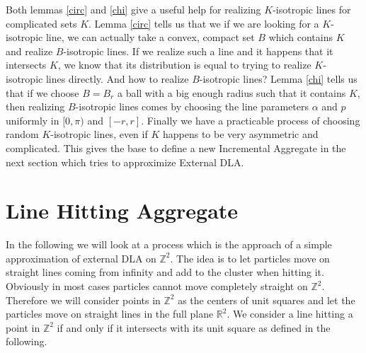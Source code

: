 \documentclass[12pt,a4paper]{scrartcl}
\numberwithin{equation}{subsection}
\newcommand{\1}{\mathbbm{1}}
\numberwithin{equation}{section}
\theoremstyle{definition}
\begin{document}
Both lemmas \ref{circ} and \ref{chi} give a useful help for realizing $K$-isotropic lines for complicated sets $K$. Lemma \ref{circ} tells us that we if we are looking for a $K$-isotropic line, we can actually take a convex, compact set $B$ which contains $K$ and realize $B$-isotropic lines. If we realize such a line and it happens that it intersects $K$, we know that its distribution is equal to trying to realize $K$-isotropic lines directly. And how to realize $B$-isotropic lines? Lemma \ref{chi} tells us that if we choose $B=B_r$ a ball with a big enough radius such that it contains $K$, then realizing $B$-isotropic lines comes by choosing the line parameters $\alpha $ and $p$ uniformly in $[0,\pi)$ and $[-r,r]$. Finally we have a practicable process of choosing random $K$-isotropic lines, even if $K$ happens to be very asymmetric and complicated. This gives the base to define a new Incremental Aggregate in the next section which tries to approximize External DLA. 

\newpage

\section{Line Hitting Aggregate}

In the following we will look at a process which is the approach of a simple approximation of external DLA on $\mathbb{Z}^2$. The idea is to let particles move on straight lines coming from infinity and add to the cluster when hitting it. Obviously in most cases particles cannot move completely straight on $\mathbb{Z}^2$. Therefore we will consider points in $\mathbb{Z}^2$ as the centers of unit squares and let the particles move on straight lines in the full plane $\mathbb{R}^2$. We consider a line hitting a point in $\mathbb{Z}^2$ if and only if it intersects with its unit square as defined in the following. 
\end{document}
